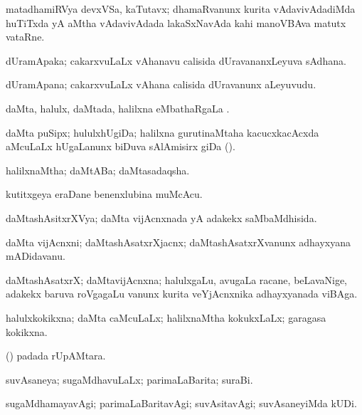 \bentry
{}
\gl{\nA}
\expl{\Latin\ }
\bmng
matadhamiRVya devxVSa, kaTutavx; dhamaRvanunx kurita vAdavivAdadiMda huTiTxda yA aMtha vAdavivAdada lakaSxNavAda kahi manoVBAva matutx vataRne. 
\emng
\eentry

\bentry
{}
\gl{\nA}
\bmng
dUramApaka; cakarxvuLaLx vAhanavu calisida dUravananxLeyuva sAdhana. 
\emng
\eentry

\bentry
{}
\gl{\nA}
\bmng
dUramApana; cakarxvuLaLx vAhana calisida dUravanunx aLeyuvudu. 
\emng
\eentry

\bentry
{}
\gl{\sapUpa}
\bmng
daMta, halulx, daMtada, halilxna eMbathaRgaLa \sapUpa. 
\emng
\eentry

\bentry
{}
\gl{\nA}
\bmng
daMta puSipx; hululxhUgiDa; halilxna gurutinaMtaha kacucxkacAcxda aMcuLaLx hUgaLanunx biDuva sAlAmisirx giDa (). 
\emng
\eentry

\bentry
{}
\gl{\gu}
\bmng
halilxnaMtha; daMtABa; daMtasadaqsha. 
\emng
\eentry

\bentry
{}
\gl{\nA}
\bmng
kutitxgeya eraDane benenxlubina muMcAcu. 
\emng
\eentry

\bentry
{}
\gl{\gu}
\bmng
daMtashAsitxrXVya; daMta vijAcnxnada yA adakekx saMbaMdhisida. 
\emng
\eentry

\bentry
{}
\gl{\nA}
\bmng
daMta vijAcnxni; daMtashAsatxrXjacnx; daMtashAsatxrXvanunx adhayxyana mADidavanu. 
\emng
\eentry

\bentry
{}
\gl{\nA}
\bmng
daMtashAsatxrX; daMtavijAcnxna; halulxgaLu, avugaLa racane, beLavaNige, adakekx baruva roVgagaLu \mo vanunx kurita veYjAcnxnika adhayxyanada viBAga. 
\emng
\eentry

\bentry
{}
\gl{\gu}
\bmng
halulxkokikxna; daMta caMcuLaLx; halilxnaMtha kokukxLaLx; garagasa kokikxna. 
\emng
\eentry

\bentry
{}
\gl{\nA}
\bmng
(\AmA)  padada rUpAMtara. 
\emng
\eentry

\bentry
{}
\gl{\gu}
\bmng
suvAsaneya; sugaMdhavuLaLx; parimaLaBarita; suraBi. 
\emng
\eentry

\bentry
{}
\gl{\kirxvi}
\bmng
sugaMdhamayavAgi; parimaLaBaritavAgi; suvAsitavAgi; suvAsaneyiMda kUDi. 
\emng
\eentry


